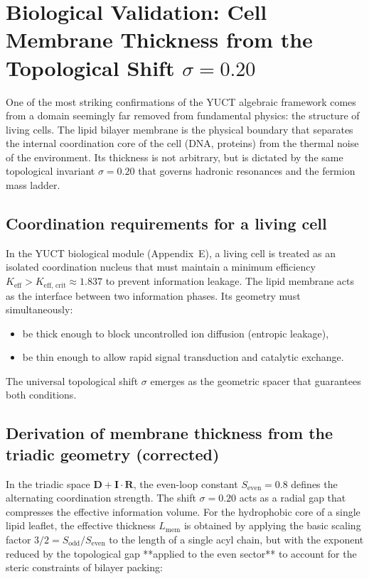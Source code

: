 \documentclass[12pt,a4paper]{article}
\begin{document}
	\section*{Biological Validation: Cell Membrane Thickness from the Topological Shift \(\sigma = 0.20\)}
	\label{sec:membrane}
	
	One of the most striking confirmations of the YUCT algebraic framework comes from a domain seemingly far removed from fundamental physics: the structure of living cells. The lipid bilayer membrane is the physical boundary that separates the internal coordination core of the cell (DNA, proteins) from the thermal noise of the environment. Its thickness is not arbitrary, but is dictated by the same topological invariant \(\sigma = 0.20\) that governs hadronic resonances and the fermion mass ladder.
	
	\subsection*{Coordination requirements for a living cell}
	
	In the YUCT biological module (Appendix~E), a living cell is treated as an isolated coordination nucleus that must maintain a minimum efficiency \(K_{\mathrm{eff}} > K_{\mathrm{eff,\,crit}} \approx 1.837\) to prevent information leakage. The lipid membrane acts as the interface between two information phases. Its geometry must simultaneously:
	\begin{itemize}
		\item be thick enough to block uncontrolled ion diffusion (entropic leakage),
		\item be thin enough to allow rapid signal transduction and catalytic exchange.
	\end{itemize}
	The universal topological shift \(\sigma\) emerges as the geometric spacer that guarantees both conditions.
	
	\subsection*{Derivation of membrane thickness from the triadic geometry (corrected)}
	
	In the triadic space \(\mathbf{D} + \mathbf{I}\!\cdot\!\mathbf{R}\), the even-loop constant \(S_{\mathrm{even}} = 0.8\) defines the alternating coordination strength. The shift \(\sigma = 0.20\) acts as a radial gap that compresses the effective information volume. For the hydrophobic core of a single lipid leaflet, the effective thickness \(L_{\mathrm{mem}}\) is obtained by applying the basic scaling factor \(3/2 = S_{\mathrm{odd}}/S_{\mathrm{even}}\) to the length of a single acyl chain, but with the exponent reduced by the topological gap **applied to the even sector** to account for the steric constraints of bilayer packing:
	
\end{document}
